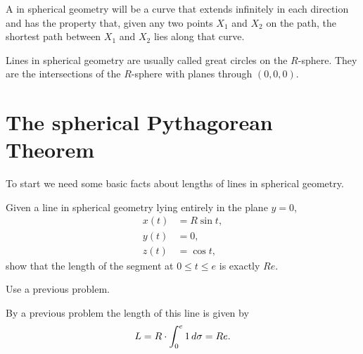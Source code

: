 \documentclass[newpage,hints,handout]{ximera}
\begin{document}
\begin{definition}
A  in spherical geometry will be a curve that extends
infinitely in each direction and has the property that, given any two
points $X_{1}$ and $X_{2}$ on the path, the shortest path between
$X_{1}$ and $X_{2}$ lies along that curve.

Lines in spherical geometry are usually called great circles on the
$R$-sphere. They are the intersections of the $R$-sphere with planes
through $(0,0,0)$.
\end{definition}


\section{The spherical Pythagorean Theorem}

To start we need some basic facts about lengths of lines in spherical
geometry.
\begin{problem}
  Given a line in spherical geometry lying entirely in the plane $y=0$,
  \begin{align*}
    x(t) &= R\sin t,\\
    y(t) &= 0,\\
    z(t) &= \cos t,
  \end{align*}
  show that the length of the segment at $0 \leq t \leq e$ is exactly $Re$.
  \begin{hint}
    Use a previous problem.
  \end{hint}
  \begin{freeResponse}
    By a previous problem the length of this line is given by
    \[
    L=R \cdot \int_{0}^e 1 \,d\sigma = Re.
    \]
  \end{freeResponse}
\end{problem}
\end{document}
